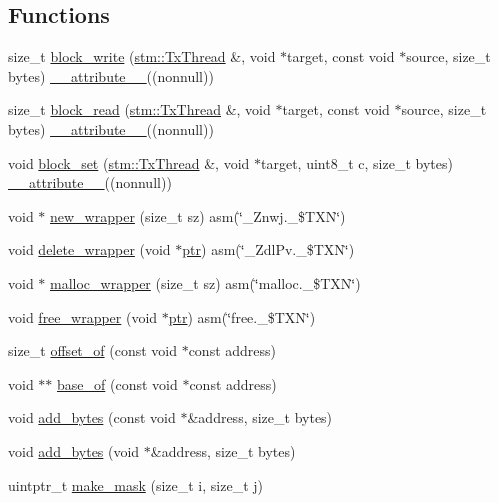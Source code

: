 \subsection*{Functions}
\begin{DoxyCompactItemize}
\item 
size\-\_\-t \hyperlink{namespaceitm2stm_a60fadbf1779483f2446ab9e30aa1f713}{block\-\_\-write} (\hyperlink{structstm_1_1TxThread}{stm\-::\-Tx\-Thread} \&, void $\ast$target, const void $\ast$source, size\-\_\-t bytes) \hyperlink{counted__ptr_8hpp_a454a5e4bfc1243a175baaa7327bb751f}{\-\_\-\-\_\-attribute\-\_\-\-\_\-}((nonnull))
\item 
size\-\_\-t \hyperlink{namespaceitm2stm_ab76a65e75d1318bd4c1e4dab11096446}{block\-\_\-read} (\hyperlink{structstm_1_1TxThread}{stm\-::\-Tx\-Thread} \&, void $\ast$target, const void $\ast$source, size\-\_\-t bytes) \hyperlink{counted__ptr_8hpp_a454a5e4bfc1243a175baaa7327bb751f}{\-\_\-\-\_\-attribute\-\_\-\-\_\-}((nonnull))
\item 
void \hyperlink{namespaceitm2stm_ad658616dcf595ab736e02f0f4f274f67}{block\-\_\-set} (\hyperlink{structstm_1_1TxThread}{stm\-::\-Tx\-Thread} \&, void $\ast$target, uint8\-\_\-t c, size\-\_\-t bytes) \hyperlink{counted__ptr_8hpp_a454a5e4bfc1243a175baaa7327bb751f}{\-\_\-\-\_\-attribute\-\_\-\-\_\-}((nonnull))
\item 
void $\ast$ \hyperlink{namespaceitm2stm_aed4f4d7200a5ff399b09aad2038e2469}{new\-\_\-wrapper} (size\-\_\-t sz) asm(\char`\"{}\-\_\-\-Znwj.\-\_\-\$\-T\-X\-N\char`\"{})
\item 
void \hyperlink{namespaceitm2stm_ae5823a99476da1284952a94f795c8a88}{delete\-\_\-wrapper} (void $\ast$\hyperlink{counted__ptr_8hpp_ac0fd97c9323e3a3981515b00166f14d8}{ptr}) asm(\char`\"{}\-\_\-\-Zdl\-Pv.\-\_\-\$\-T\-X\-N\char`\"{})
\item 
void $\ast$ \hyperlink{namespaceitm2stm_a1d7d549547990a85a10a6a21d5b86e9a}{malloc\-\_\-wrapper} (size\-\_\-t sz) asm(\char`\"{}malloc.\-\_\-\$\-T\-X\-N\char`\"{})
\item 
void \hyperlink{namespaceitm2stm_afb85155fcabb8af0b40dc1e7b54703fb}{free\-\_\-wrapper} (void $\ast$\hyperlink{counted__ptr_8hpp_ac0fd97c9323e3a3981515b00166f14d8}{ptr}) asm(\char`\"{}free.\-\_\-\$\-T\-X\-N\char`\"{})
\item 
size\-\_\-t \hyperlink{namespaceitm2stm_aa9908b113027ae21130750939980ee0b}{offset\-\_\-of} (const void $\ast$const address)
\item 
void $\ast$$\ast$ \hyperlink{namespaceitm2stm_a6c0f462e6a92340d0aaff5050c4a6ed6}{base\-\_\-of} (const void $\ast$const address)
\item 
void \hyperlink{namespaceitm2stm_a334b9615cac957b9ce7a4743beaaaf53}{add\-\_\-bytes} (const void $\ast$\&address, size\-\_\-t bytes)
\item 
void \hyperlink{namespaceitm2stm_a1af29eeeb5839a27d75426db18c6c1c1}{add\-\_\-bytes} (void $\ast$\&address, size\-\_\-t bytes)
\item 
uintptr\-\_\-t \hyperlink{namespaceitm2stm_a7bfcca557e548ad294de7fe74eb4cdf6}{make\-\_\-mask} (size\-\_\-t i, size\-\_\-t j)
\end{DoxyCompactItemize}


